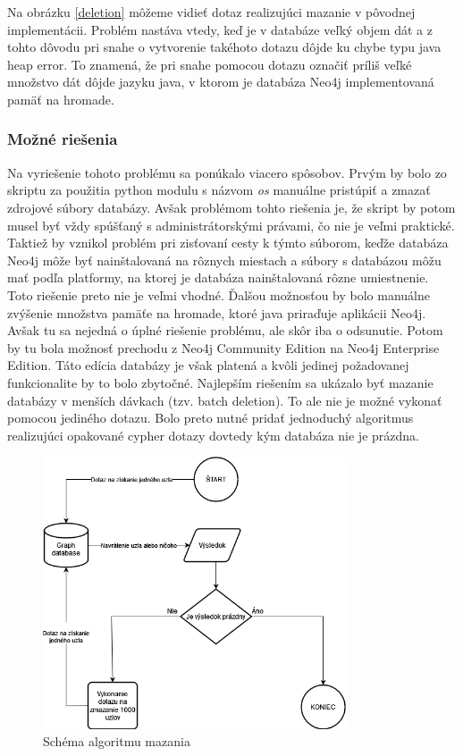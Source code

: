Na obrázku \ref{deletion} môžeme vidieť dotaz realizujúci mazanie v pôvodnej implementácii. Problém nastáva vtedy, keď je v databáze veľký objem dát a z tohto dôvodu pri snahe o vytvorenie takéhoto dotazu dôjde ku chybe typu java heap error. To znamená, že pri snahe pomocou dotazu označiť príliš veľké množstvo dát dôjde jazyku java, v ktorom je databáza Neo4j implementovaná pamäť na hromade.

\subsubsection{Možné riešenia}

Na vyriešenie tohoto problému sa ponúkalo viacero spôsobov. Prvým by bolo zo skriptu za použitia python modulu s názvom \textit{os} manuálne pristúpiť a zmazať zdrojové súbory databázy. Avšak problémom tohto riešenia je, že skript by potom musel byť vždy spúšťaný s administrátorskými právami, čo nie je veľmi praktické. Taktiež by vznikol problém pri zisťovaní cesty k týmto súborom, keďže databáza Neo4j môže byť nainštalovaná na rôznych miestach a súbory s databázou môžu mať podľa platformy, na ktorej je databáza nainštalovaná rôzne umiestnenie. Toto riešenie preto nie je veľmi vhodné. Ďalšou možnosťou by bolo manuálne zvýšenie množstva pamäťe na hromade, ktoré java priraďuje aplikácii Neo4j. Avšak tu sa nejedná o úplné riešenie problému, ale skôr iba o odsunutie. Potom by tu bola možnosť prechodu z Neo4j Community Edition na Neo4j Enterprise Edition. Táto edícia databázy je však platená a kvôli jedinej požadovanej funkcionalite by to bolo zbytočné. Najlepším riešením sa ukázalo byť mazanie databázy v menších dávkach (tzv. batch deletion). To ale nie je možné vykonať pomocou jediného dotazu. Bolo preto nutné pridať jednoduchý algoritmus realizujúci opakované cypher dotazy dovtedy kým databáza nie je prázdna.

\begin{figure}[h]
\label{batchdelete}
\centering
\includegraphics[width=0.8\textwidth]{obrazky-figures/Database-deletion.png}
\caption{Schéma algoritmu mazania}
\end{figure}

